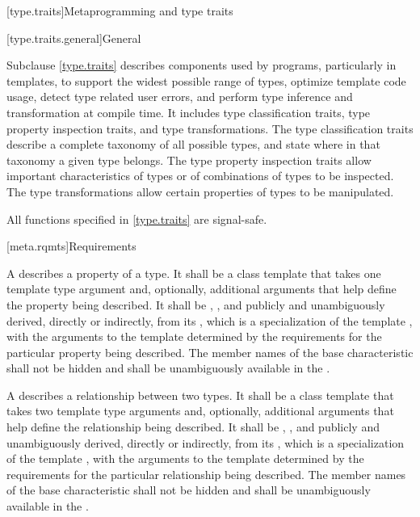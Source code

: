 [type.traits]{Metaprogramming and type traits}

[type.traits.general]{General}

\pnum
Subclause \ref{type.traits} describes components used by \Cpp{} programs, particularly in
templates, to support the widest possible range of types, optimize
template code usage, detect type related user errors, and perform
type inference and transformation at compile time. It includes type
classification traits, type property inspection traits, and type
transformations. The type classification traits describe a complete taxonomy
of all possible \Cpp{} types, and state where in that taxonomy a given
type belongs. The type property inspection traits allow important
characteristics of types or of combinations of types to be inspected. The
type transformations allow certain properties of types to be manipulated.

\pnum
{}%
All functions specified in \ref{type.traits} are signal-safe.

[meta.rqmts]{Requirements}

\pnum
A  describes a property
of a type. It shall be a class template that takes one template type
argument and, optionally, additional arguments that help define the
property being described. It shall be ,
,
and publicly and unambiguously derived, directly or indirectly, from
its , which is
a specialization of the template
, with
the arguments to the template  determined by the
requirements for the particular property being described.
The member names of the base characteristic shall not be hidden and shall be
unambiguously available in the .

\pnum
A  describes a
relationship between two types. It shall be a class template that
takes two template type arguments and, optionally, additional
arguments that help define the relationship being described. It shall
be , ,
and publicly and unambiguously derived, directly or
indirectly, from
its , which is a specialization
of the template
, with
the arguments to the template  determined by the
requirements for the particular relationship being described.
The member names of the base characteristic shall not be hidden and shall be
unambiguously available in the .

